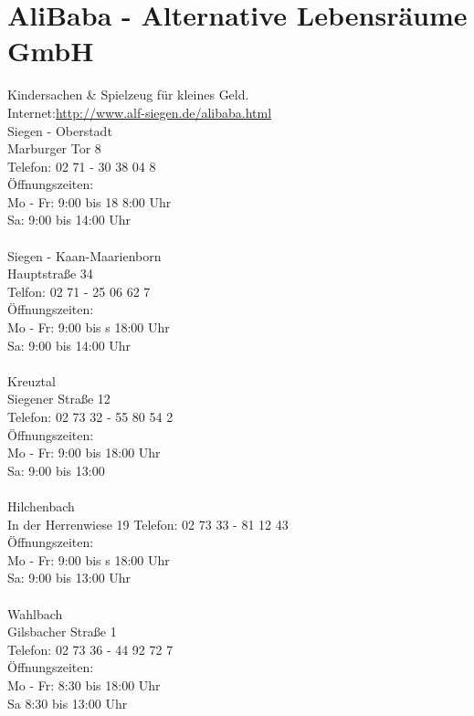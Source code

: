 \section{AliBaba - Alternative Lebensräume GmbH}
Kindersachen \& Spielzeug für kleines Geld.\\
Internet:\href{http://www.alf-siegen.de/alibaba.html}{http://www.alf-siegen.de/alibaba.html}
\\
Siegen - Oberstadt\\
Marburger Tor 8\\
Telefon: 02 71 - 30 38 04 8\\
Öffnungszeiten:\\
Mo - Fr: 9:00 bis 18 8:00 Uhr \\
Sa: 9:00 bis 14:00 Uhr\\ 
\\
Siegen - Kaan-Maarienborn\\
Hauptstraße 34\\
Telfon: 02 71 - 25 06 62 7\\ 
Öffnungszeiten:\\
Mo - Fr: 9:00 bis s 18:00 Uhr\\ 
Sa: 9:00 bis 14:00 Uhr\\
\\
Kreuztal \\ 
Siegener Straße 12\\  
Telefon: 02 73 32 - 55 80 54 2\\ 
Öffnungszeiten:\\
Mo - Fr: 9:00 bis 18:00 Uhr\\
Sa: 9:00 bis 13:00\\
\\
Hilchenbach\\
In der Herrenwiese 19 
Telefon: 02 73 33 - 81 12 43\\ 
Öffnungszeiten:\\
Mo - Fr: 9:00 bis s 18:00 Uhr\\
Sa: 9:00 bis 13:00 Uhr\\
\\
Wahlbach\\
Gilsbacher Straße 1\\  
Telefon: 02 73 36 - 44 92 72 7 \\
Öffnungszeiten: \\
Mo - Fr: 8:30 bis 18:00 Uhr \\
Sa 8:30 bis 13:00  Uhr \\